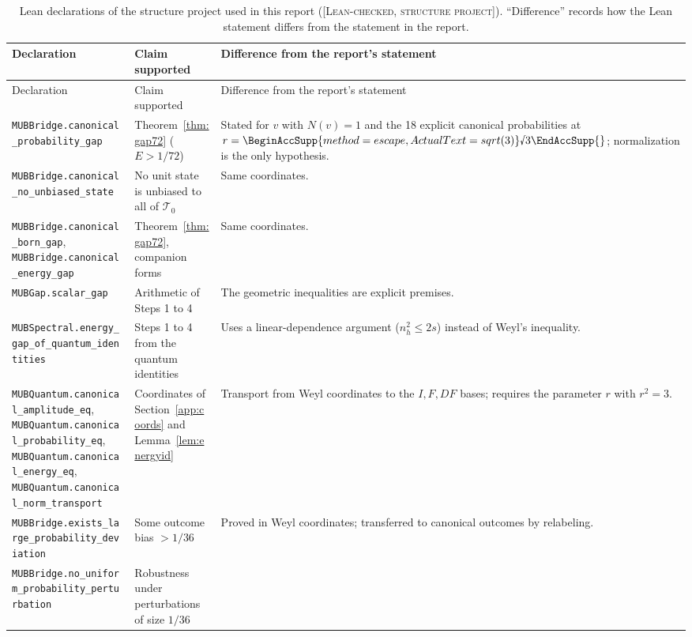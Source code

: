 \documentclass[11pt]{article}
\newcommand{\rnum}[1]{\BeginAccSupp{method=escape,ActualText=sqrt(#1)}\text{\textsurd}#1\EndAccSupp{}}
\newcommand{\Tz}{\mathcal{T}_0}          %
\newcommand{\E}{E}                       %
\newcommand{\st}[1]{\textsc{[#1]}}
\newcommand{\stlean}{\st{Lean-checked, structure project}}
\theoremstyle{definition}
\theoremstyle{remark}
\begin{document}
{\footnotesize
\begin{longtable}{@{}>{\raggedright\arraybackslash}p{5.6cm}>{\raggedright\arraybackslash}p{4.2cm}>{\raggedright\arraybackslash}p{5.6cm}@{}}
\caption{Lean declarations of the structure project used in this report (\stlean). ``Difference'' records how the Lean
statement differs from the statement in the report.}\label{tab:lean}\\
\toprule
Declaration & Claim supported & Difference from the report's statement\\
\midrule\endfirsthead
\toprule
Declaration & Claim supported & Difference from the report's statement\\
\midrule\endhead
\texttt{MUBBridge.}\allowbreak\texttt{canonical\_probability\_gap} & Theorem~\ref{thm:gap72} ($\E>1/72$) & Stated for
$v$ with $N(v)=1$ and the 18 explicit canonical probabilities at $r=\rnum{3}$; normalization is the only
hypothesis.\\
\texttt{MUBBridge.}\allowbreak\texttt{canonical\_no\_unbiased\_state} & No unit state is unbiased to all of $\Tz$ & Same coordinates.\\
\texttt{MUBBridge.}\allowbreak\texttt{canonical\_born\_gap}, \texttt{MUBBridge.}\allowbreak\texttt{canonical\_energy\_gap} & Theorem~\ref{thm:gap72},
companion forms & Same coordinates.\\
\texttt{MUBGap.}\allowbreak\texttt{scalar\_gap} & Arithmetic of Steps 1 to 4 & The geometric inequalities are explicit premises.\\
\texttt{MUBSpectral.}\allowbreak\texttt{energy\_gap\_of\_quantum\_identities} & Steps 1 to 4 from the quantum identities & Uses a
linear-dependence argument ($n_h^2\le2s$) instead of Weyl's inequality.\\
\texttt{MUBQuantum.}\allowbreak\texttt{canonical\_amplitude\_eq}, \texttt{MUBQuantum.}\allowbreak\texttt{canonical\_probability\_eq},
\texttt{MUBQuantum.}\allowbreak\texttt{canonical\_energy\_eq}, \texttt{MUBQuantum.}\allowbreak\texttt{canonical\_norm\_transport} & Coordinates of Section~\ref{app:coords}
and Lemma~\ref{lem:energyid} & Transport from Weyl coordinates to the $I,F,DF$ bases; requires the parameter
$r$ with $r^2=3$.\\
\texttt{MUBBridge.}\allowbreak\texttt{exists\_large\_}\allowbreak\texttt{probability\_deviation} & Some outcome bias $>1/36$ & Proved in Weyl
coordinates; transferred to canonical outcomes by relabeling.\\
\texttt{MUBBridge.}\allowbreak\texttt{no\_uniform\_}\allowbreak\texttt{probability\_perturbation} & Robustness under perturbations of size $1/36$ &

\end{longtable}}
\end{document}
